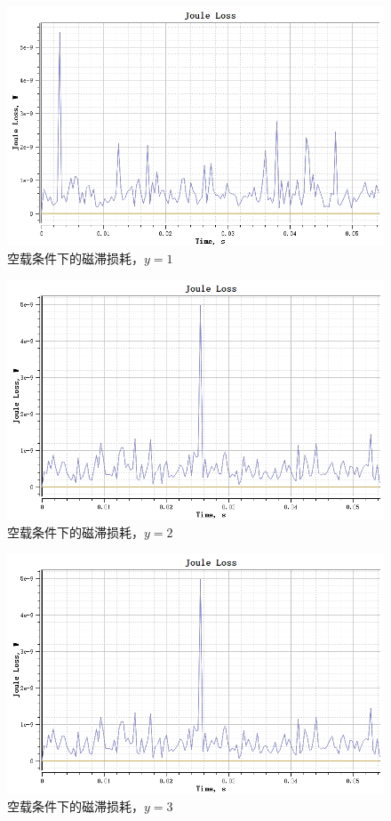 \documentclass{thuemp}
\begin{document}
\begin{figure}[H]
  \centering
  \includegraphics[width=1\linewidth]{./img/task2/joule-y1.png}
  \caption{空载条件下的磁滞损耗，$y=1$}
\end{figure}
\begin{figure}[H]
  \centering
  \includegraphics[width=1\linewidth]{./img/task2/joule-y2.png}
  \caption{空载条件下的磁滞损耗，$y=2$}
\end{figure}
\begin{figure}[H]
  \centering
  \includegraphics[width=1\linewidth]{./img/task2/joule-y2.png}
  \caption{空载条件下的磁滞损耗，$y=3$}
\end{figure}
\end{document}
